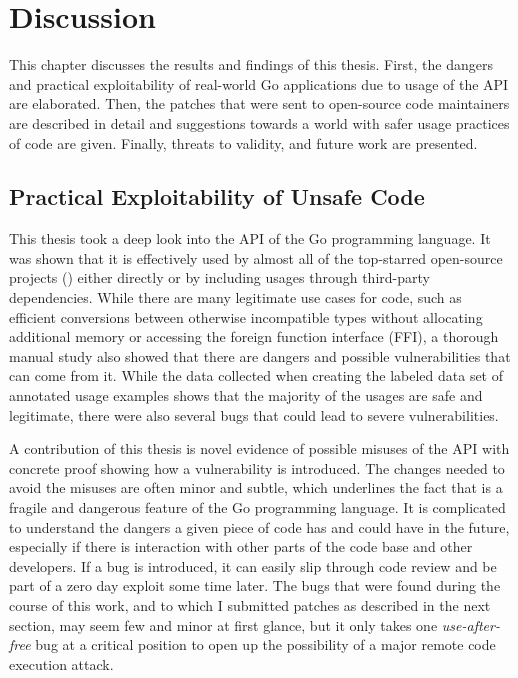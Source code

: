 
\chapter{Discussion}\label{ch:discussion}

This chapter discusses the results and findings of this thesis.
First, the dangers and practical exploitability of real-world Go applications due to usage of the \unsafe{} API are
elaborated.
Then, the patches that were sent to open-source code maintainers  are described in detail and suggestions towards a
world with safer usage practices of \unsafe{} code are given.
Finally, threats to validity, and future work are presented.



\section{Practical Exploitability of Unsafe Code}\label{sec:discussion:exploitability}

This thesis took a deep look into the \unsafe{} API of the Go programming language.
It was shown that it is effectively used by almost all of the \projsAnalyzed{} top-starred open-source projects
(\percentageUnsafeTransitiveWithDependencies{}) either directly or by including \unsafe{} usages through third-party
dependencies.
While there are many legitimate use cases for \unsafe{} code, such as efficient conversions between otherwise
incompatible types without allocating additional memory or accessing the foreign function interface (\acrshort{FFI}),
a thorough manual study also showed that there are dangers and possible vulnerabilities that can come from it.
While the data collected when creating the labeled data set of annotated \unsafe{} usage examples shows that the
majority of the usages are safe and legitimate, there were also several bugs that could lead to severe vulnerabilities.

A contribution of this thesis is novel evidence of possible misuses of the \unsafe{} \acrshort{API} with concrete proof
showing how a vulnerability is introduced.
The changes needed to avoid the misuses are often minor and subtle, which underlines the fact that \unsafe{} is a
fragile and dangerous feature of the Go programming language.
It is complicated to understand the dangers a given piece of code has and could have in the future, especially if there
is interaction with other parts of the code base and other developers.
If a bug is introduced, it can easily slip through code review and be part of a zero day exploit some time later.
The bugs that were found during the course of this work, and to which I submitted patches as described in the next
section, may seem few and minor at first glance, but it only takes one \textit{use-after-free} bug at a critical
position to open up the possibility of a major remote code execution attack.

